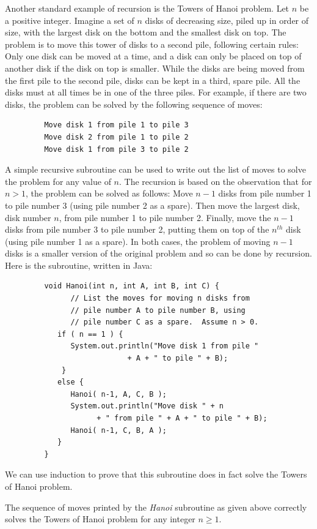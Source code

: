 Another standard example of recursion is the Towers of Hanoi problem.
Let $n$ be a positive integer.  Imagine a set of $n$ disks of decreasing
size, piled up in order of size, with the largest disk on the bottom
and the smallest disk on top.  The problem is to move this tower of
disks to a second pile, following certain rules:  Only one disk
can be moved at a time, and a disk can only be placed on top of
another disk if the disk on top is smaller.  While the disks are
being moved from the first pile to the second pile, disks can be
kept in a third, spare pile.   All the disks must at all times be
in one of the three piles.  For example, if there are two disks,
the problem can be solved by the following sequence of moves:
\begin{verbatim}
         Move disk 1 from pile 1 to pile 3
         Move disk 2 from pile 1 to pile 2
         Move disk 1 from pile 3 to pile 2
\end{verbatim}
A simple recursive subroutine can be used to write out the list
of moves to solve the problem for any value of $n$.  The recursion is
based on the observation that for $n>1$, the problem can be
solved as follows:  Move $n-1$ disks from pile number 1 to pile number 3
(using pile number 2 as a spare).  Then move the largest disk, disk number $n$,
from pile number 1 to pile number 2.  Finally, move the $n-1$ disks from
pile number 3 to pile number 2, putting them on top of the $n^{th}$ disk
(using pile number 1 as a spare).  In both cases, the problem of
moving $n-1$ disks is a smaller version of the original problem and
so can be done by recursion.  Here is the subroutine, written in Java:
\begin{verbatim}
         void Hanoi(int n, int A, int B, int C) {
               // List the moves for moving n disks from
               // pile number A to pile number B, using
               // pile number C as a spare.  Assume n > 0.
            if ( n == 1 ) {
               System.out.println("Move disk 1 from pile "
                            + A + " to pile " + B);
             }
            else {
               Hanoi( n-1, A, C, B );
               System.out.println("Move disk " + n
                     + " from pile " + A + " to pile " + B);
               Hanoi( n-1, C, B, A );
            }
         }
\end{verbatim}
We can use induction to prove that this subroutine does in
fact solve the Towers of Hanoi problem.
\begin{theorem}
The sequence of moves printed by the \textit{Hanoi} subroutine as given above
correctly solves the Towers of Hanoi problem for any integer $n\ge1$.
\end{theorem}
